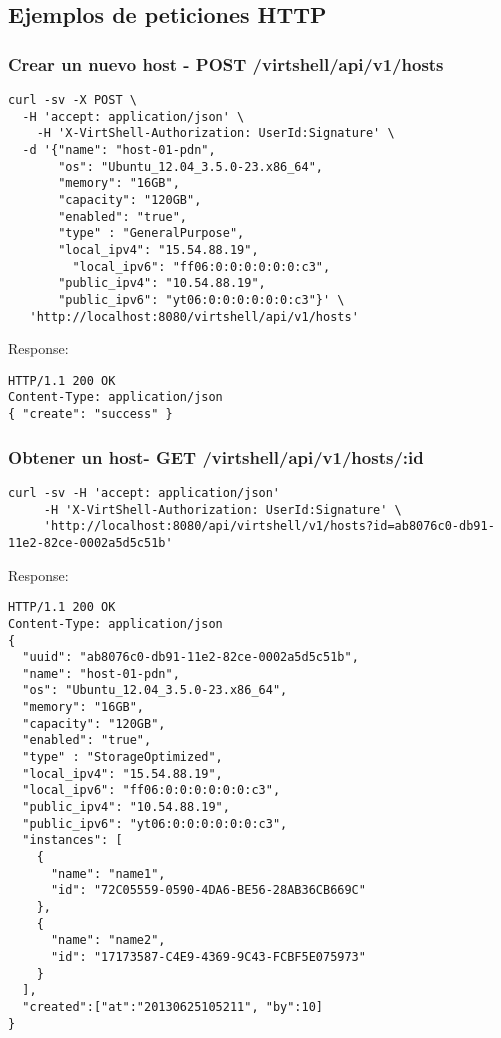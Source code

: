 \subsection{Ejemplos de peticiones HTTP}

\subsubsection{Crear un nuevo host - POST /virtshell/api/v1/hosts}

\begin{lstlisting}[style=json]
curl -sv -X POST \
  -H 'accept: application/json' \
    -H 'X-VirtShell-Authorization: UserId:Signature' \
  -d '{"name": "host-01-pdn",
       "os": "Ubuntu_12.04_3.5.0-23.x86_64",
       "memory": "16GB",
       "capacity": "120GB",
       "enabled": "true",
       "type" : "GeneralPurpose",
       "local_ipv4": "15.54.88.19",
         "local_ipv6": "ff06:0:0:0:0:0:0:c3",
       "public_ipv4": "10.54.88.19",
       "public_ipv6": "yt06:0:0:0:0:0:0:c3"}' \
   'http://localhost:8080/virtshell/api/v1/hosts'
\end{lstlisting}

Response:

\begin{lstlisting}[style=json]
HTTP/1.1 200 OK
Content-Type: application/json
{ "create": "success" }
\end{lstlisting}

\subsubsection{Obtener un host- GET /virtshell/api/v1/hosts/:id}

\begin{lstlisting}[style=json]
curl -sv -H 'accept: application/json' 
     -H 'X-VirtShell-Authorization: UserId:Signature' \ 
     'http://localhost:8080/api/virtshell/v1/hosts?id=ab8076c0-db91-11e2-82ce-0002a5d5c51b'
\end{lstlisting}

Response:

\begin{lstlisting}[style=json]
HTTP/1.1 200 OK
Content-Type: application/json
{
  "uuid": "ab8076c0-db91-11e2-82ce-0002a5d5c51b",
  "name": "host-01-pdn",
  "os": "Ubuntu_12.04_3.5.0-23.x86_64",
  "memory": "16GB",
  "capacity": "120GB",
  "enabled": "true",
  "type" : "StorageOptimized",
  "local_ipv4": "15.54.88.19",
  "local_ipv6": "ff06:0:0:0:0:0:0:c3",
  "public_ipv4": "10.54.88.19",
  "public_ipv6": "yt06:0:0:0:0:0:0:c3",
  "instances": [
    {
      "name": "name1",
      "id": "72C05559-0590-4DA6-BE56-28AB36CB669C"
    },
    {
      "name": "name2",
      "id": "17173587-C4E9-4369-9C43-FCBF5E075973"
    }
  ],
  "created":["at":"20130625105211", "by":10]
}
\end{lstlisting}

